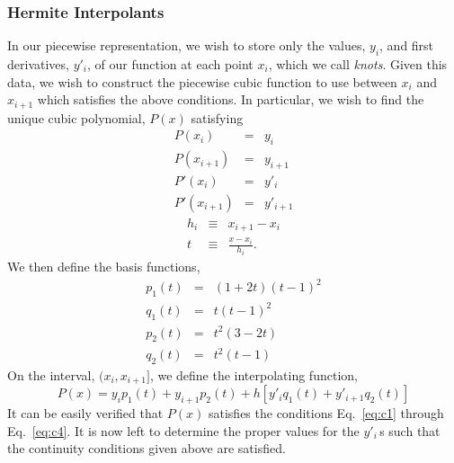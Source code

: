 \subsubsection{Hermite Interpolants}
In our piecewise representation, we wish to store only the values,
$y_i$, and first derivatives, $y'_i$, of our function at each point
$x_i$, which we call {\em knots}.  Given this data, we wish to
construct the piecewise cubic function to use between $x_i$ and
$x_{i+1}$ which satisfies the above conditions.  In particular, we
wish to find the unique cubic polynomial, $P(x)$ satisfying
\begin{eqnarray}
P(x_i)      & = & y_i      \label{eq:c1} \\
P(x_{i+1})  & = & y_{i+1}  \label{eq:c2} \\
P'(x_i)     & = & y'_i     \label{eq:c3} \\
P'(x_{i+1}) & = & y'_{i+1} \label{eq:c4}
\end{eqnarray}
\begin{eqnarray}
h_i & \equiv & x_{i+1} - {x_i} \\
t & \equiv & \frac{x-x_i}{h_i}.
\end{eqnarray}
We then define the basis functions,
\begin{eqnarray}
p_1(t) & = & (1+2t)(t-1)^2  \label{eq:p1}\\
q_1(t) & = & t (t-1)^2      \\
p_2(t) & = & t^2(3-2t)      \\
q_2(t) & = & t^2(t-1)      \label{eq:q2}
\end{eqnarray}
On the interval, $(x_i, x_{i+1}]$, we define the interpolating
function,
\begin{equation}
P(x) = y_i p_1(t) + y_{i+1}p_2(t) + h\left[y'_i q_1(t) + y'_{i+1} q_2(t)\right]
\end{equation}
It can be easily verified that $P(x)$ satisfies the conditions Eq.~\ref{eq:c1}
through Eq.~\ref{eq:c4}.  It is now left to
determine the proper values for the $y'_i\,$s such that the continuity
conditions given above are satisfied.

